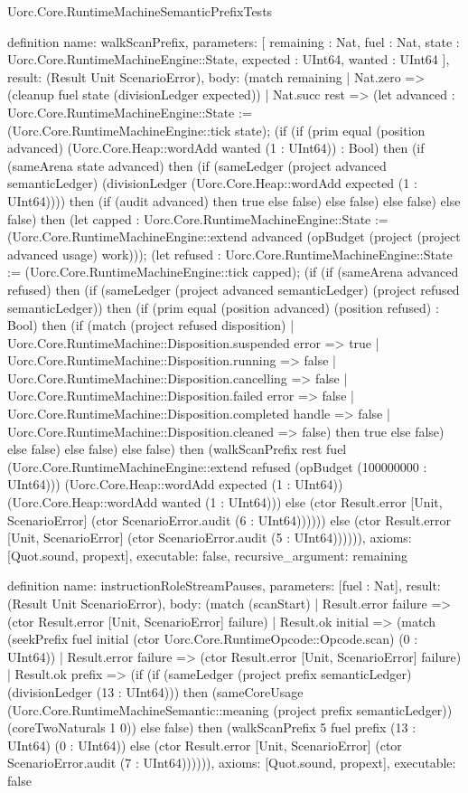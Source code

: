\begin{lexlean}{Uorc.Core.RuntimeMachineSemanticPrefixTests}
\begin{semanticmodule}
definition{
  name: walkScanPrefix,
  parameters: [
    remaining : Nat,
    fuel : Nat,
    state : Uorc.Core.RuntimeMachineEngine::State,
    expected : UInt64,
    wanted : UInt64
  ],
  result: (Result Unit ScenarioError),
  body: (match remaining
    | Nat.zero => (cleanup fuel state (divisionLedger expected))
    | Nat.succ rest => (let advanced : Uorc.Core.RuntimeMachineEngine::State := (Uorc.Core.RuntimeMachineEngine::tick state); (if (if (prim equal (position advanced) (Uorc.Core.Heap::wordAdd wanted (1 : UInt64)) : Bool) then (if (sameArena state advanced) then (if (sameLedger (project advanced semanticLedger) (divisionLedger (Uorc.Core.Heap::wordAdd expected (1 : UInt64)))) then (if (audit advanced) then true else false) else false) else false) else false) then (let capped : Uorc.Core.RuntimeMachineEngine::State := (Uorc.Core.RuntimeMachineEngine::extend advanced (opBudget (project (project advanced usage) work))); (let refused : Uorc.Core.RuntimeMachineEngine::State := (Uorc.Core.RuntimeMachineEngine::tick capped); (if (if (sameArena advanced refused) then (if (sameLedger (project advanced semanticLedger) (project refused semanticLedger)) then (if (prim equal (position advanced) (position refused) : Bool) then (if (match (project refused disposition)
      | Uorc.Core.RuntimeMachine::Disposition.suspended error => true
      | Uorc.Core.RuntimeMachine::Disposition.running => false
      | Uorc.Core.RuntimeMachine::Disposition.cancelling => false
      | Uorc.Core.RuntimeMachine::Disposition.failed error => false
      | Uorc.Core.RuntimeMachine::Disposition.completed handle => false
      | Uorc.Core.RuntimeMachine::Disposition.cleaned => false) then true else false) else false) else false) else false) then (walkScanPrefix rest fuel (Uorc.Core.RuntimeMachineEngine::extend refused (opBudget (100000000 : UInt64))) (Uorc.Core.Heap::wordAdd expected (1 : UInt64)) (Uorc.Core.Heap::wordAdd wanted (1 : UInt64))) else (ctor Result.error [Unit, ScenarioError] (ctor ScenarioError.audit (6 : UInt64)))))) else (ctor Result.error [Unit, ScenarioError] (ctor ScenarioError.audit (5 : UInt64)))))),
  axioms: [Quot.sound, propext],
  executable: false,
  recursive_argument: remaining
}

definition{
  name: instructionRoleStreamPauses,
  parameters: [fuel : Nat],
  result: (Result Unit ScenarioError),
  body: (match (scanStart)
    | Result.error failure => (ctor Result.error [Unit, ScenarioError] failure)
    | Result.ok initial => (match (seekPrefix fuel initial (ctor Uorc.Core.RuntimeOpcode::Opcode.scan) (0 : UInt64))
      | Result.error failure => (ctor Result.error [Unit, ScenarioError] failure)
      | Result.ok prefix => (if (if (sameLedger (project prefix semanticLedger) (divisionLedger (13 : UInt64))) then (sameCoreUsage (Uorc.Core.RuntimeMachineSemantic::meaning (project prefix semanticLedger)) (coreTwoNaturals 1 0)) else false) then (walkScanPrefix 5 fuel prefix (13 : UInt64) (0 : UInt64)) else (ctor Result.error [Unit, ScenarioError] (ctor ScenarioError.audit (7 : UInt64)))))),
  axioms: [Quot.sound, propext],
  executable: false
}


\end{semanticmodule}
\end{lexlean}
